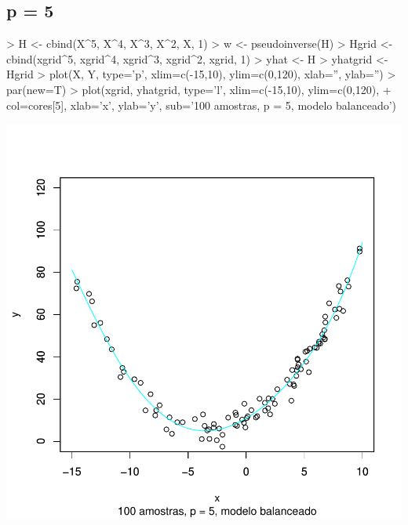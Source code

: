 \documentclass{article}
\begin{document}
\subsection{p = 5}
\begin{Schunk}
\begin{Sinput}
> H <- cbind(X^5, X^4, X^3, X^2, X, 1)
> w <- pseudoinverse(H) %
> Hgrid <- cbind(xgrid^5, xgrid^4, xgrid^3, xgrid^2, xgrid, 1)
> yhat <- H %
> yhatgrid <- Hgrid %
> plot(X, Y, type='p', xlim=c(-15,10), ylim=c(0,120), xlab='', ylab='')
> par(new=T)
> plot(xgrid, yhatgrid, type='l', xlim=c(-15,10), ylim=c(0,120),
+      col=cores[5], xlab='x', ylab='y', sub='100 amostras, p = 5, modelo balanceado')
\end{Sinput}
\end{Schunk}
\includegraphics{aprox-015}
\end{document}
